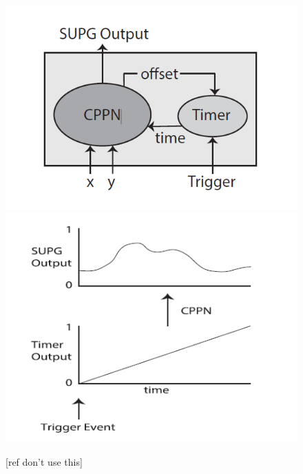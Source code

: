 \documentclass[11pt, a4paper]{article}
\begin{document}
\begin{figure}[!ht]
\centering
\includegraphics[scale=0.5]{SUPG}
\includegraphics[scale=0.5]{SUPGLinearTime}
\caption{[ref don't use this]}
\end{figure}
\end{document}
